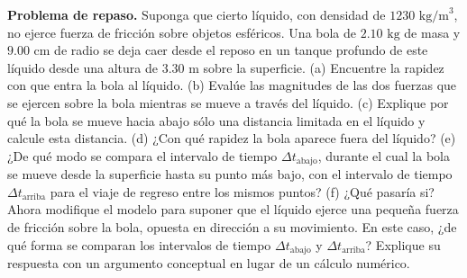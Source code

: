 \item \textbf{Problema de repaso.} Suponga que cierto líquido, con densidad de $1230 \text{ kg/m}^3$, no ejerce fuerza de fricción sobre objetos esféricos. Una bola de $2.10 \text{ kg}$ de masa y $9.00 \text{ cm}$ de radio se deja caer desde el reposo en un tanque profundo de este líquido desde una altura de $3.30 \text{ m}$ sobre la superficie. (a) Encuentre la rapidez con que entra la bola al líquido. (b) Evalúe las magnitudes de las dos fuerzas que se ejercen sobre la bola mientras se mueve a través del líquido. (c) Explique por qué la bola se mueve hacia abajo sólo una distancia limitada en el líquido y calcule esta distancia. (d) ¿Con qué rapidez la bola aparece fuera del líquido? (e) ¿De qué modo se compara el intervalo de tiempo $\Delta t_{\text{abajo}}$, durante el cual la bola se mueve desde la superficie hasta su punto más bajo, con el intervalo de tiempo $\Delta t_{\text{arriba}}$ para el viaje de regreso entre los mismos puntos? (f) ¿Qué pasaría si? Ahora modifique el modelo para suponer que el líquido ejerce una pequeña fuerza de fricción sobre la bola, opuesta en dirección a su movimiento. En este caso, ¿de qué forma se comparan los intervalos de tiempo $\Delta t_{\text{abajo}}$ y $\Delta t_{\text{arriba}}$? Explique su respuesta con un argumento conceptual en lugar de un cálculo numérico.
